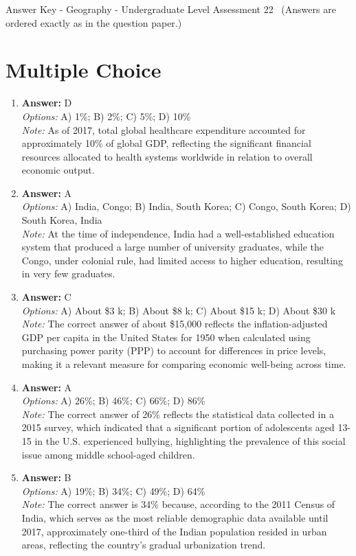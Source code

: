 \documentclass[12pt]{article}
\begin{document}
\begin{center}
Answer Key - Geography - Undergraduate Level Assessment 22 \
\small (Answers are ordered exactly as in the question paper.)
\end{center}

\section*{Multiple Choice}
\begin{enumerate}[label=\arabic*.]
\item \textbf{Answer:} D
\\ \textit{Options:} A) 1\%; B) 2\%; C) 5\%; D) 10\%
\\ \textit{Note:} As of 2017, total global healthcare expenditure accounted for approximately 10\% of global GDP, reflecting the significant financial resources allocated to health systems worldwide in relation to overall economic output.
\item \textbf{Answer:} A
\\ \textit{Options:} A) India, Congo; B) India, South Korea; C) Congo, South Korea; D) South Korea, India
\\ \textit{Note:} At the time of independence, India had a well-established education system that produced a large number of university graduates, while the Congo, under colonial rule, had limited access to higher education, resulting in very few graduates.
\item \textbf{Answer:} C
\\ \textit{Options:} A) About \$3 k; B) About \$8 k; C) About \$15 k; D) About \$30 k
\\ \textit{Note:} The correct answer of about \$15,000 reflects the inflation-adjusted GDP per capita in the United States for 1950 when calculated using purchasing power parity (PPP) to account for differences in price levels, making it a relevant measure for comparing economic well-being across time.
\item \textbf{Answer:} A
\\ \textit{Options:} A) 26\%; B) 46\%; C) 66\%; D) 86\%
\\ \textit{Note:} The correct answer of 26\% reflects the statistical data collected in a 2015 survey, which indicated that a significant portion of adolescents aged 13-15 in the U.S. experienced bullying, highlighting the prevalence of this social issue among middle school-aged children.
\item \textbf{Answer:} B
\\ \textit{Options:} A) 19\%; B) 34\%; C) 49\%; D) 64\%
\\ \textit{Note:} The correct answer is 34\% because, according to the 2011 Census of India, which serves as the most reliable demographic data available until 2017, approximately one-third of the Indian population resided in urban areas, reflecting the country's gradual urbanization trend.
\end{enumerate}
\end{document}

